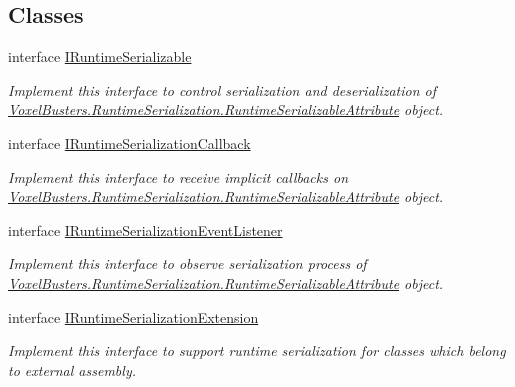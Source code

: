 \subsection*{Classes}
\begin{DoxyCompactItemize}
\item 
interface \hyperlink{interface_voxel_busters_1_1_runtime_serialization_1_1_i_runtime_serializable}{I\+Runtime\+Serializable}
\begin{DoxyCompactList}\small\item\em Implement this interface to control serialization and deserialization of \hyperlink{class_voxel_busters_1_1_runtime_serialization_1_1_runtime_serializable_attribute}{Voxel\+Busters.\+Runtime\+Serialization.\+Runtime\+Serializable\+Attribute} object. \end{DoxyCompactList}\item 
interface \hyperlink{interface_voxel_busters_1_1_runtime_serialization_1_1_i_runtime_serialization_callback}{I\+Runtime\+Serialization\+Callback}
\begin{DoxyCompactList}\small\item\em Implement this interface to receive implicit callbacks on \hyperlink{class_voxel_busters_1_1_runtime_serialization_1_1_runtime_serializable_attribute}{Voxel\+Busters.\+Runtime\+Serialization.\+Runtime\+Serializable\+Attribute} object. \end{DoxyCompactList}\item 
interface \hyperlink{interface_voxel_busters_1_1_runtime_serialization_1_1_i_runtime_serialization_event_listener}{I\+Runtime\+Serialization\+Event\+Listener}
\begin{DoxyCompactList}\small\item\em Implement this interface to observe serialization process of \hyperlink{class_voxel_busters_1_1_runtime_serialization_1_1_runtime_serializable_attribute}{Voxel\+Busters.\+Runtime\+Serialization.\+Runtime\+Serializable\+Attribute} object. \end{DoxyCompactList}\item 
interface \hyperlink{interface_voxel_busters_1_1_runtime_serialization_1_1_i_runtime_serialization_extension}{I\+Runtime\+Serialization\+Extension}
\begin{DoxyCompactList}\small\item\em Implement this interface to support runtime serialization for classes which belong to external assembly. \end{DoxyCompactList}\item 

\end{DoxyCompactItemize}
